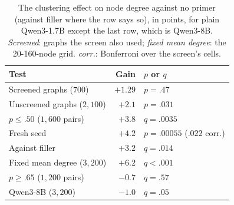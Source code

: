\documentclass[11pt]{article}
\begin{document}
\begin{table}[!t]
\centering\scriptsize
\setlength{\tabcolsep}{4pt}
\begin{tabular}{lrl}
\toprule
Test & Gain & $p$ or $q$\\
\midrule
Screened graphs ($700$) & $+1.29$ & $p=.47$\\ %
Unscreened graphs ($2{,}100$) & $+2.1$ & $p=.031$\\ %
$p\leq.50$ ($1{,}600$ pairs) & $+3.8$ & $q=.0035$\\ %
Fresh seed & $+4.2$ & $p=.00055$ ($.022$ corr.)\\ %
Against filler & $+3.2$ & $q=.014$\\ %
Fixed mean degree ($3{,}200$) & $+6.2$ & $q<.001$\\ %
$p\geq.65$ ($1{,}200$ pairs) & $-0.7$ & $q=.57$\\ %
Qwen3-8B ($3{,}200$) & $-1.0$ & $q=.05$\\ %
\bottomrule
\end{tabular}
\caption{The clustering effect on node degree against no primer (against filler where the row says so), in points, for plain Qwen3-1.7B except the last row, which is Qwen3-8B. \emph{Screened}: graphs the screen also used; \emph{fixed mean degree}: the 20-160-node grid. \emph{corr.}: Bonferroni over the screen's cells.}
\label{tab:clust}
\end{table}
\end{document}
